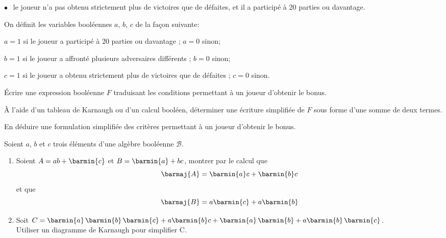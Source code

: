 \begin{exercice}
\begin{enumerate}
              $\bullet~~$  le joueur n'a pas obtenu strictement plus de victoires que de défaites, et il a participé à 20
              parties ou davantage.

              On définit les variables booléennes $a$, $b$, $c$ de la façon suivante:

              $a = 1$ si le joueur a participé à 20 parties ou davantage ; $a = 0$ sinon;

              $b = 1$ si le joueur a affronté plusieurs adversaires différents ; $b = 0$ sinon;

              $c = 1$ si le joueur a obtenu strictement plus de victoires que de défaites ; $c = 0$ sinon.
              \begin{enumalph}
                  \item Écrire une expression booléenne $F$ traduisant les conditions permettant à un joueur d'obtenir le bonus.
                  \item À l'aide d'un tableau de Karnaugh ou d'un calcul booléen, déterminer une écriture simplifiée de $F$ sous forme d'une somme de deux termes.
                  \item En déduire une formulation simplifiée des critères permettant à un joueur d'obtenir le bonus.
              \end{enumalph}
    \end{enumerate}
\end{exercice}


\begin{exercice}[]
    Soient $a$, $b$ et $c$ trois éléments d'une algèbre booléenne $\mathcal{B}$.

    \begin{enumerate}
        \item 	Soient $A=ab+\barmin{c}$ et $B=\barmin{a}+bc$, montrer par le calcul que $$\barmaj{A}=\barmin{a}c+\barmin{b}c$$ et que $$\barmaj{B}=a\barmin{c}+a\barmin{b}$$
        \item 	Soit $C=\barmin{a}\,\barmin{b}\,\barmin{c}+a\barmin{b}c+\barmin{a}\,\barmin{b}+a\barmin{b}\,\barmin{c}$.\\
              Utiliser un diagramme de Karnaugh pour simplifier C.\\
    \end{enumerate}
\end{exercice}

